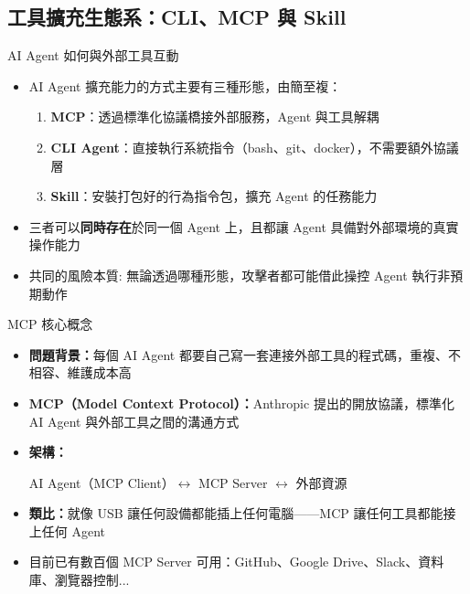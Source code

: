 \documentclass[aspectratio=1610]{Common/MyCourseBeamer}
\begin{document}
\subsection{工具擴充生態系：CLI、MCP 與 Skill}

\begin{frame}{AI Agent 如何與外部工具互動}

	\begin{itemize}
		\item AI Agent 擴充能力的方式主要有三種形態，由簡至複：
			\begin{enumerate}
            	\item \textbf{MCP}：透過標準化協議橋接外部服務，Agent 與工具解耦
				\item \textbf{CLI Agent}：直接執行系統指令（bash、git、docker），不需要額外協議層

				\item \textbf{Skill}：安裝打包好的行為指令包，擴充 Agent 的任務能力
			\end{enumerate}

		\item 三者可以\textbf{同時存在}於同一個 Agent 上，且都讓 Agent 具備對外部環境的真實操作能力

		\item \alert{共同的風險本質:} 無論透過哪種形態，攻擊者都可能借此操控 Agent 執行非預期動作
	\end{itemize}

\end{frame}





\begin{frame}{MCP 核心概念}

	\begin{itemize}
		\item \textbf{問題背景：}每個 AI Agent 都要自己寫一套連接外部工具的程式碼，重複、不相容、維護成本高

		\item \textbf{MCP（Model Context Protocol）：}Anthropic 提出的開放協議，標準化 AI Agent 與外部工具之間的溝通方式

		\item \textbf{架構：}
			\begin{center}
				AI Agent（MCP Client）$\longleftrightarrow$ MCP Server $\longleftrightarrow$ 外部資源
			\end{center}

		\item \textbf{類比：}就像 USB 讓任何設備都能插上任何電腦——MCP 讓任何工具都能接上任何 Agent

		\item 目前已有數百個 MCP Server 可用：GitHub、Google Drive、Slack、資料庫、瀏覽器控制...
	\end{itemize}

\end{frame}
\end{document}

